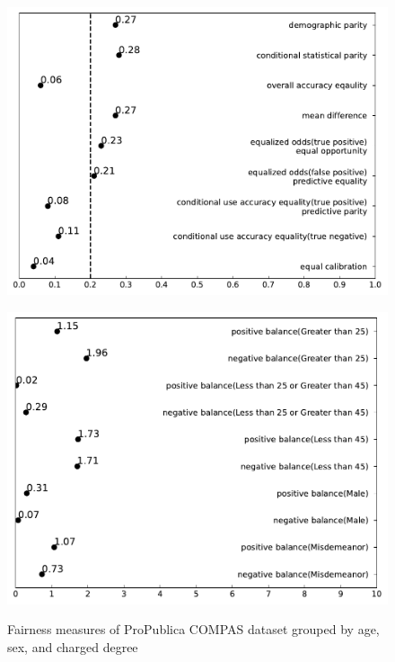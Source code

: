 \documentclass[conference]{IEEEtran}
\begin{document}
\begin{figure}[h]
\begin{minipage}[b]{0.48\linewidth}
        \includegraphics[width=\linewidth]{Greater than 45}
        \label{fig:2}
    \end{minipage}
    \hfill
    \begin{minipage}[b]{0.48\linewidth}
        \centering
        \includegraphics[width=\linewidth]{misc balance}
        \label{fig:2}
    \end{minipage}
    \caption{Fairness measures of ProPublica COMPAS dataset grouped by age, sex, and charged degree}
    \label{fig:compas2}
\end{figure}




\end{document}
